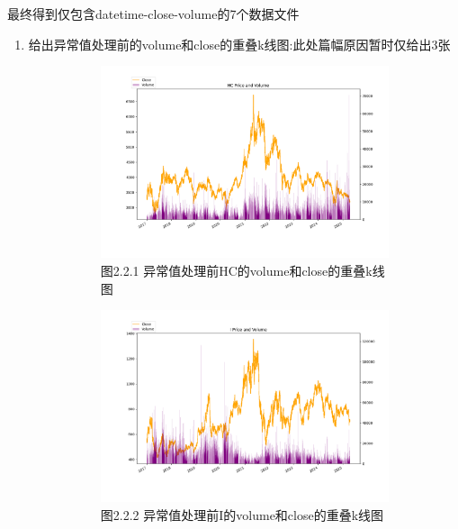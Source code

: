 \documentclass[a4paper,12pt]{ctexart}
\begin{document}
最终得到仅包含datetime-close-volume的7个数据文件
\begin{enumerate}
  \item 给出异常值处理前的volume和close的重叠k线图:此处篇幅原因暂时仅给出3张
\FloatBarrier
\noindent
\begin{figure}[H]
  \centering
  \begin{subfigure}[t]{0.4\textwidth}
    \includegraphics[width=\textwidth]{./v2/v0/HC.png}
    \caption*{图2.2.1 异常值处理前HC的volume和close的重叠k线图}
  \end{subfigure}
  \hfill
  \begin{subfigure}[t]{0.4\textwidth}
    \includegraphics[width=\textwidth]{./v2/v0/I.png}
    \caption*{图2.2.2 异常值处理前I的volume和close的重叠k线图}
  \end{subfigure}
  \hfill
  \begin{subfigure}[t]{0.4\textwidth}

\end{subfigure}
\end{figure}
\end{enumerate}
\end{document}
